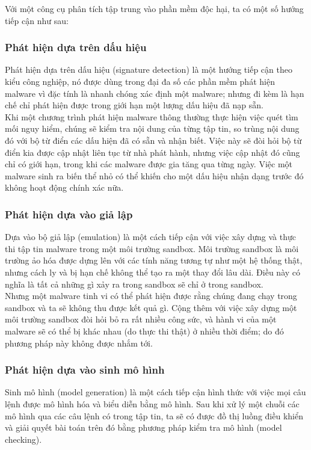 Với một công cụ phân tích tập trung vào phần mềm độc hại, ta có một số hướng tiếp cận như sau:
		\subsubsection{Phát hiện dựa trên dấu hiệu}
Phát hiện dựa trên dấu hiệu (signature detection) là một hướng tiếp cận theo kiểu công nghiệp, nó được dùng trong đại đa số các phần mềm phát hiện malware vì đặc tính là nhanh chóng xác định một malware; nhưng đi kèm là hạn chế chỉ phát hiện được trong giới hạn một lượng dấu hiệu đã nạp sẵn.\\

Khi một chương trình phát hiện malware thông thường thực hiện việc quét tìm mối nguy hiểm, chúng sẽ kiểm tra nội dung của từng tập tin, so trùng nội dung đó với bộ từ điển các dấu hiện đã có sẵn và nhận biết. Việc này sẽ đòi hỏi bộ từ điển kia được cập nhật liên tục từ nhà phát hành, nhưng việc cập nhật đó cũng chỉ có giới hạn, trong khi các malware được gia tăng qua từng ngày. Việc một malware sinh ra biến thể nhỏ có thể khiến cho một dấu hiệu nhận dạng trước đó không hoạt động chính xác nữa.

		\subsubsection{Phát hiện dựa vào giả lập}
Dựa vào bộ giả lập (emulation) là một cách tiếp cận với việc xây dựng và thực thi tập tin malware trong một môi trường sandbox. Môi trường sandbox là môi trường ảo hóa được dựng lên với các tính năng tương tự như một hệ thống thật, nhưng cách ly và bị hạn chế không thể tạo ra một thay đổi lâu dài. Điều này có nghĩa là tất cả những gì xảy ra trong sandbox sẽ chỉ ở trong sandbox.\\

Nhưng một malware tinh vi có thể phát hiện được rằng chúng đang chạy trong sandbox và ta sẽ không thu được kết quả gì. Cộng thêm với việc xây dựng một môi trường sandbox đòi hỏi bỏ ra rất nhiều công sức, và hành vi của một malware sẽ có thể bị khác nhau (do thực thi thật) ở nhiều thời điểm; do đó phương pháp này không được nhắm tới.

		\subsubsection{Phát hiện dựa vào sinh mô hình}

Sinh mô hình (model generation) là một cách tiếp cận hình thức với việc mọi câu lệnh được mô hình hóa và biểu diễn bằng mô hình. Sau khi xử lý một chuỗi các mô hình qua các câu lệnh có trong tập tin, ta sẽ có được đồ thị luồng điều khiển và giải quyết bài toán trên đó bằng phương pháp kiểm tra mô hình (model checking).

